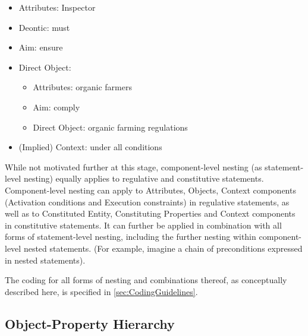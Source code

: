 \begin{itemize}
\itemsep0em
\item Attributes: Inspector
\item Deontic: must
\item Aim: ensure
\item Direct Object: 
\begin{itemize}
\itemsep0em
\item Attributes: organic farmers 
\item Aim: comply
\item Direct Object: organic farming regulations
\end{itemize}
\item (Implied) Context: under all conditions
\end{itemize}

While not motivated further at this stage, component-level nesting (as statement-level nesting) equally applies to regulative and constitutive statements. Component-level nesting can apply to Attributes, Objects, Context components (Activation conditions and Execution constraints) in regulative statements, as well as to Constituted Entity, Constituting Properties and Context components in constitutive statements. It can further be applied in combination with all forms of statement-level nesting, including the further nesting within component-level nested statements. (For example, imagine a chain of preconditions expressed in nested statements). 

The coding for all forms of nesting and combinations thereof, as conceptually described here, is specified in \cref{sec:CodingGuidelines}.

\subsection{Object-Property Hierarchy}
\label{subsec:AttributeObjectHierarchy}

